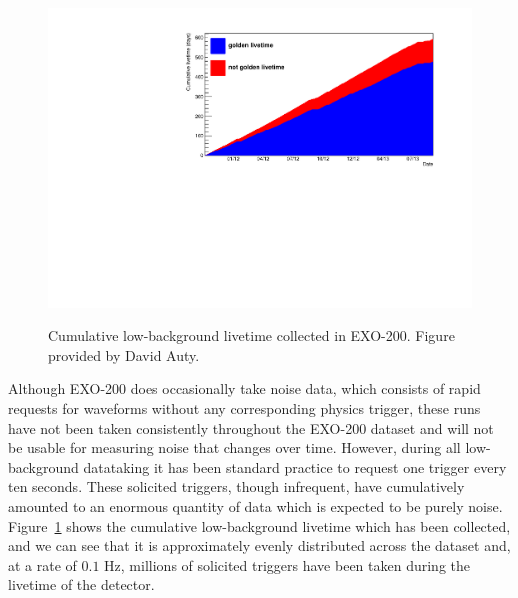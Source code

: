 \begin{figure}
\begin{center}
\includegraphics[keepaspectratio=true,width=\textwidth]{scripts/livetime.pdf}
\end{center}
\renewcommand{\baselinestretch}{1}
\small\normalsize
\begin{quote}
\caption{Cumulative low-background livetime collected in EXO-200.  Figure provided by David Auty.}
\label{fig:CumulativeLivetime}
\end{quote}
\end{figure}
\renewcommand{\baselinestretch}{2}
\small\normalsize

Although EXO-200 does occasionally take noise data, which consists of rapid requests for waveforms without any corresponding physics trigger, these runs have not been taken consistently throughout the EXO-200 dataset and will not be usable for measuring noise that changes over time.  However, during all low-background datataking it has been standard practice to request one trigger every ten seconds.  These solicited triggers, though infrequent, have cumulatively amounted to an enormous quantity of data which is expected to be purely noise.  Figure~\ref{fig:CumulativeLivetime} shows the cumulative low-background livetime which has been collected, and we can see that it is approximately evenly distributed across the dataset and, at a rate of $0.1$ Hz, millions of solicited triggers have been taken during the livetime of the detector.

